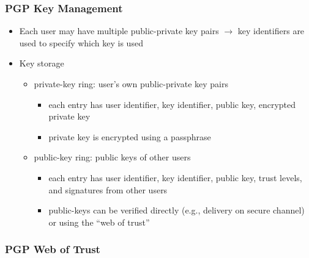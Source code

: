 \documentclass[final]{article}
\begin{document}
\subsubsection*{PGP Key Management}
\begin{itemize}[nosep]
    \item Each user may have multiple public-private key pairs $\rightarrow$ key identifiers are used to specify which key is used
    \item Key storage
          \begin{itemize}[nosep]
              \item private-key ring: user's own public-private key pairs
                    \begin{itemize}[nosep]
                        \item each entry has user identifier, key identifier, public key, encrypted private key
                        \item private key is encrypted using a passphrase
                    \end{itemize}
              \item public-key ring: public keys of other users
                    \begin{itemize}[nosep]
                        \item each entry has user identifier, key identifier, public key, trust levels, and signatures from other users
                        \item public-keys can be verified directly (e.g., delivery on secure channel) or using the “web of trust”
                    \end{itemize}
          \end{itemize}
\end{itemize}
\subsubsection*{PGP Web of Trust}
\begin{figure}[H]
\end{figure}
\end{document}

